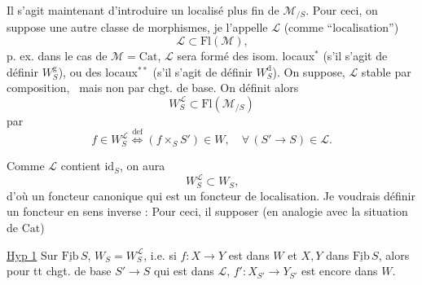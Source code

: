 Il s'agit maintenant d'introduire un localisé plus fin de $\mathcal M_{/S}$. Pour ceci, on suppose  une autre classe de morphismes, je l'appelle $\mathcal L$ (comme ``localisation'')
\[
\mathcal L\subset\mathrm{Fl}(\mathcal M)\text{,}
\]
p. ex. dans le cas de $\mathcal M=\mathrm{Cat}$, $\mathcal L$  sera formé des  isom. locaux$^{*}$ (s'il s'agit de définir $W_S^{\mathrm g}$), ou des  locaux$^{**}$ (s'il s'agit de définir $W_S^{\mathrm d}$). On suppose,  $\mathcal L$ stable par composition, \,\unsure{,} mais non par chgt. de base.
On définit alors
\[
W_S^{\mathcal L}\subset\mathrm{Fl}(\mathcal M_{/S})
\]
par
\[
f\in W_S^{\mathcal L}\overset{\mathrm{def}}{\Longleftrightarrow}(f\times_S S')\in W,\quad\forall\,(S'\longrightarrow S)\in\mathcal L\text{.}
\]

Comme  $\mathcal L$ contient $\mathrm{id}_S$, on aura
\[
W_S^{\mathcal L}\subset W_S\text{,}
\]
d'où un foncteur canonique
qui est un foncteur de localisation. Je voudrais définir un foncteur en sens inverse : Pour ceci, il   supposer (en analogie avec la situation de $\mathrm{Cat}$)

\uline{Hyp 1} Sur $\underline{\mathrm{Fib}}\,S$, $W_S=W_S^{\mathcal L}$, i.e. si $f:X\longrightarrow Y$ est dans $W$ et $X,Y$ dans $\underline{\mathrm{Fib}}\,S$, alors  pour tt chgt. de base $S'\longrightarrow S$ qui est dans $\mathcal L$, $f':X_{S'}\longrightarrow Y_{S'}$ est encore dans $W$.

